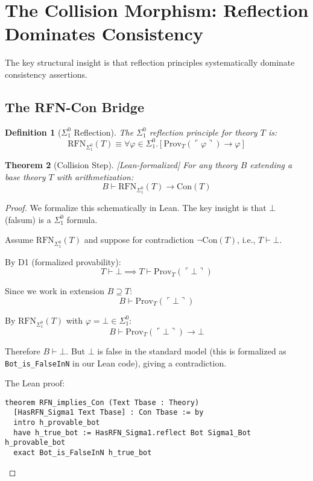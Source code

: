 \documentclass[11pt]{article}
\newtheorem{theorem}{Theorem}[section]
\newtheorem{definition}[theorem]{Definition}
\newcommand{\Con}{\mathrm{Con}}
\newcommand{\RFNSigOne}{\mathrm{RFN}_{\Sigma^0_1}}
\newcommand{\Prov}{\mathrm{Prov}}
\newcommand{\leanok}{\textsf{\textcolor{green!70!black}{[Lean-formalized]}}}
\begin{document}
\section{The Collision Morphism: Reflection Dominates Consistency}

The key structural insight is that reflection principles systematically dominate consistency assertions.

\subsection{The RFN-Con Bridge}

\begin{definition}[$\Sigma^0_1$ Reflection]
The $\Sigma^0_1$ reflection principle for theory $T$ is:
$$\RFNSigOne(T) \equiv \forall \varphi \in \Sigma^0_1. [\Prov_T(\ulcorner\varphi\urcorner) \to \varphi]$$
\end{definition}

\begin{theorem}[Collision Step] \leanok
For any theory $B$ extending a base theory $T$ with arithmetization:
$$B \vdash \RFNSigOne(T) \to \Con(T)$$
\end{theorem}

\begin{proof}
We formalize this schematically in Lean. The key insight is that $\bot$ (falsum) is a $\Sigma^0_1$ formula.

Assume $\RFNSigOne(T)$ and suppose for contradiction $\neg\Con(T)$, i.e., $T \vdash \bot$.

By D1 (formalized provability):
$$T \vdash \bot \implies T \vdash \Prov_T(\ulcorner\bot\urcorner)$$

Since we work in extension $B \supseteq T$:
$$B \vdash \Prov_T(\ulcorner\bot\urcorner)$$

By $\RFNSigOne(T)$ with $\varphi = \bot \in \Sigma^0_1$:
$$B \vdash \Prov_T(\ulcorner\bot\urcorner) \to \bot$$

Therefore $B \vdash \bot$. But $\bot$ is false in the standard model (this is formalized as \texttt{Bot\_is\_FalseInN} in our Lean code), giving a contradiction.

The Lean proof:
\begin{lstlisting}[language=Lean]
theorem RFN_implies_Con (Text Tbase : Theory) 
  [HasRFN_Sigma1 Text Tbase] : Con Tbase := by
  intro h_provable_bot
  have h_true_bot := HasRFN_Sigma1.reflect Bot Sigma1_Bot h_provable_bot
  exact Bot_is_FalseInN h_true_bot
\end{lstlisting}
\end{proof}
\end{document}
